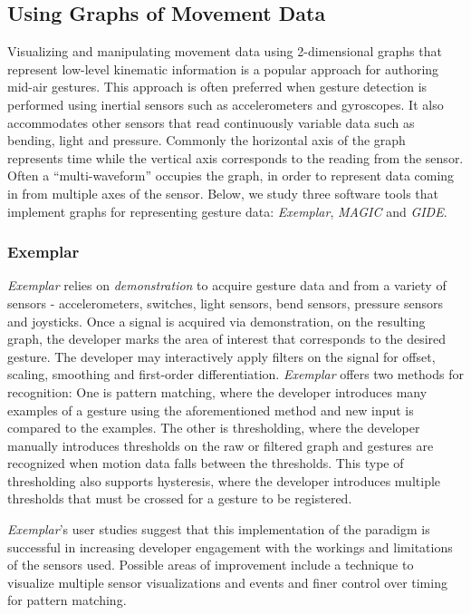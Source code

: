 \subsection{Using Graphs of Movement Data}

Visualizing and manipulating movement data using 2-dimensional graphs that represent low-level kinematic information is a popular approach for authoring mid-air gestures. This approach is often preferred when gesture detection is performed using inertial sensors such as accelerometers and gyroscopes. It also accommodates other sensors that read continuously variable data such as bending, light and pressure. Commonly the horizontal axis of the graph represents time while the vertical axis corresponds to the reading from the sensor. Often a “multi-waveform” occupies the graph, in order to represent data coming in from multiple axes of the sensor. Below, we study three software tools that implement graphs for representing gesture data: \emph{Exemplar}, \emph{MAGIC} and \emph{GIDE}.

\subsubsection{Exemplar}

\emph{Exemplar} \parencite{Hartmann:2007} relies on \emph{demonstration} to acquire gesture data and from a variety of sensors - accelerometers, switches, light sensors, bend sensors, pressure sensors and joysticks. Once a signal is acquired via demonstration, on the resulting graph, the developer marks the area of interest that corresponds to the desired gesture. The developer may interactively apply filters on the signal for offset, scaling, smoothing and first-order differentiation. \emph{Exemplar} offers two methods for recognition: One is pattern matching, where the developer introduces many examples of a gesture using the aforementioned method and new input is compared to the examples. The other is thresholding, where the developer manually introduces thresholds on the raw or filtered graph and gestures are recognized when motion data falls between the thresholds. This type of thresholding also supports hysteresis, where the developer introduces multiple thresholds that must be crossed for a gesture to be registered.

\emph{Exemplar}’s user studies suggest that this implementation of the paradigm is successful in increasing developer engagement with the workings and limitations of the sensors used. Possible areas of improvement include a technique to visualize multiple sensor visualizations and events and finer control over timing for pattern matching.

